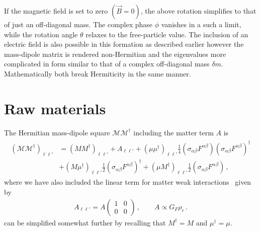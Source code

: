 If the magnetic field is set to zero $(\vec{B}=0)$, the above rotation simplifies to that of just an off-diagonal mass. The complex phase $\phi$ vanishes in a such a limit, while the rotation angle $\theta$ relaxes to the free-particle value. The inclusion of an electric field is also possible in this formation as described earlier however the mass-dipole matrix is rendered non-Hermitian and the eigenvalues more complicated in form similar to that of a complex off-diagonal mass ${\delta m}$. Mathematically both break Hermiticity in the same manner.






\section{Raw materials}
\label{sec:raw}
The Hermitian mass-dipole square $\mathcal{M}\mathcal{M}^{\dag}$ including the matter term $A$ is
\begin{align}
    \label{hermz:1}
    \begin{split}
        (\mathcal{M}\mathcal{M}^{\dag})_{\ell\ell'}
        &=(MM^{\dag})_{\ell\ell'}+A_{\ell\ell'}+(\mu\mu^{\dag})_{\ell\ell'}\frac{1}{4}\left(\sigma_{\alpha\beta}F^{\alpha\beta}\right)\left(\sigma_{\alpha\beta}F^{\alpha\beta}\right)^{\dag}\\
        &+(M\mu^{\dag})_{\ell\ell'}\frac{1}{2}\left(\sigma_{\alpha\beta}F^{\alpha\beta}\right)^{\dag}
        +(\mu M^{\dag})_{\ell\ell'}\frac{1}{2}\left(\sigma_{\alpha\beta}F^{\alpha\beta}\right)\,,        
    \end{split}
\end{align}
where we have also included the linear term for matter weak interactions~\cite{Wolfenstein:1977ue} given by
\begin{align}
    \label{matter:1}
    A_{\ell\ell'}=A
    \begin{pmatrix}
        1 & 0\\
        0 & 0
    \end{pmatrix}\,,\qquad
    A\propto G_{F}\rho_{e}\,.
\end{align}
 can be simplified somewhat further by recalling that $M^{\dag}=M$ and $\mu^{\dag}=\mu$.





